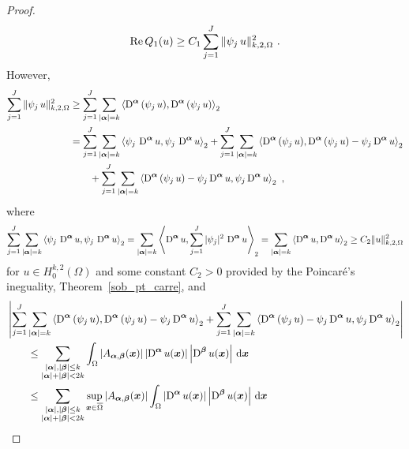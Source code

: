 \begin{proof}
\begin{equation}
\operatorname{Re} Q_1(u) \geq C_1 \sum_{j=1}^J  \| \psi_j \, u \|_{k,2,\Omega}^2 \ .
\end{equation}
However,
\begin{align}
\sum_{j=1}^J  \| \psi_j \, u \|_{k,2,\Omega}^2 &\geq
\sum_{j=1}^J  \sum_{|{\bm{\alpha}}| = k}
\left\langle{\operatorname{D}^{{\bm{\alpha}}} \left( \psi_j \, u\right)} , {\operatorname{D}^{{\bm{\alpha}}} \left( \psi_j \, u\right)}\right\rangle_2 \nonumber \\
&= \sum_{j=1}^J  \sum_{|{\bm{\alpha}}| = k}
\left\langle{\psi_j \,\operatorname{D}^{{\bm{\alpha}}} u} , {\psi_j \, \operatorname{D}^{{\bm{\alpha}}} u}\right\rangle_2
+ \sum_{j=1}^J  \sum_{|{\bm{\alpha}}|= k}
\left\langle{\operatorname{D}^{{\bm{\alpha}}}\left( \psi_j \, u\right)} , {\operatorname{D}^{{\bm{\alpha}}}\left( \psi_j \, u\right)
- \psi_j \operatorname{D}^{{\bm{\alpha}}} u}\right\rangle_2 \nonumber \\
&\qquad + \sum_{j=1}^J  \sum_{|{\bm{\alpha}}|= k}
\left\langle{\operatorname{D}^{{\bm{\alpha}}}\left( \psi_j \, u\right)
- \psi_j \operatorname{D}^{{\bm{\alpha}}} u} , {\psi_j \operatorname{D}^{{\bm{\alpha}}} u}\right\rangle_2
\ , \label{ell_garding_idx4}
\end{align}
where
\[
\sum_{j=1}^J  \sum_{|{\bm{\alpha}}| = k}
\left\langle{\psi_j \,\operatorname{D}^{{\bm{\alpha}}} u} , {\psi_j \, \operatorname{D}^{{\bm{\alpha}}} u}\right\rangle_2
= \sum_{|{\bm{\alpha}}| = k}
\left\langle{\operatorname{D}^{{\bm{\alpha}}} u} , { \sum_{j=1}^J |\psi_j|^2 \,\operatorname{D}^{{\bm{\alpha}}} u}\right\rangle_2
= \sum_{|{\bm{\alpha}}| = k} \left\langle{\operatorname{D}^{{\bm{\alpha}}} u} , {\operatorname{D}^{{\bm{\alpha}}} u}\right\rangle_2
\geq C_2 \|u\|_{k,2,\Omega}^2
\]
for $\displaystyle u \in H^{k,2}_0(\Omega)$ and
some constant $C_2>0$ provided by the Poincaré's ineguality,
Theorem~\ref{sob_pt_carre}, and
\begin{align*}
& \left| \sum_{j=1}^J \sum_{|\VEC{\alpha}|= k}
\ps{\diff^{\VEC{\alpha}}\left( \psi_j \, u\right)}
{\diff^{\VEC{\alpha}}\left( \psi_j \, u\right) - \psi_j \diff^{\VEC{\alpha}} u}_2
+ \sum_{j=1}^J  \sum_{|\VEC{\alpha}|= k}
\ps{\diff^{\VEC{\alpha}}\left( \psi_j \, u\right)
- \psi_j \diff^{\VEC{\alpha}} u}{\psi_j \diff^{\VEC{\alpha}} u}_2 \right| \\
&\qquad \leq \sum_{\substack{|\VEC{\alpha}|,|\VEC{\beta}|\leq k\\
|\VEC{\alpha}|+|\VEC{\beta}|<2k}}
\int_\Omega \left| A_{\VEC{\alpha},\VEC{\beta}}(\VEC{x})\right|
\left| \diff^{\VEC{\alpha}} u(\VEC{x}) \right|
\left| \diff^{\VEC{\beta}} u(\VEC{x}) \right| \dx{\VEC{x}} \\
&\qquad \leq \sum_{\substack{|\VEC{\alpha}|,|\VEC{\beta}|\leq k\\
|\VEC{\alpha}|+|\VEC{\beta}|<2k}} \sup_{\VEC{x} \in \overline{\Omega}}
\left| A_{\VEC{\alpha},\VEC{\beta}}(\VEC{x})\right|
\int_\Omega \left| \diff^{\VEC{\alpha}} u(\VEC{x}) \right|
\left| \diff^{\VEC{\beta}} u(\VEC{x}) \right| \dx{\VEC{x}} \\

\end{align*}
\end{proof}
